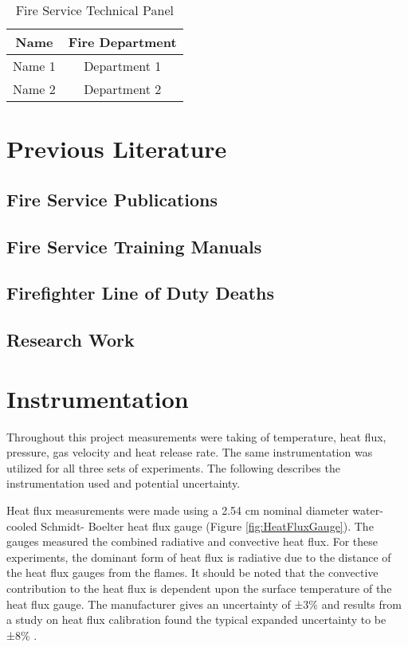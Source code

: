 \documentclass{article}
\begin{document}
\renewcommand{\arraystretch}{1.5}

\begin{table}[H]
	\centering
	\caption{Fire Service Technical Panel}
	\begin{tabular}{|c|c|}
		\hline
		\bf{Name} & \bf{Fire Department} \\ \hline \hline
		Name 1 & Department 1 \\ \hline
		Name 2 & Department 2 \\ \hline
	\end{tabular}
	\label{tab:TechPanelList}
\end{table}

\clearpage

\section{Previous Literature}
\subsection{Fire Service Publications}
\subsection{Fire Service Training Manuals}
\subsection{Firefighter Line of Duty Deaths}
\subsection{Research Work}

\clearpage

\section{Instrumentation}
Throughout this project measurements were taking of temperature, heat flux, pressure, gas velocity and heat release rate. The same instrumentation was utilized for all three sets of experiments. The following describes the instrumentation used and potential uncertainty.

Heat flux measurements were made using a 2.54 cm nominal diameter water-cooled Schmidt- Boelter heat flux gauge (Figure \ref{fig:HeatFluxGauge}). The gauges measured the combined radiative and convective heat flux. For these experiments, the dominant form of heat flux is radiative due to the distance of the heat flux gauges from the flames. It should be noted that the convective contribution to the heat flux is dependent upon the surface temperature of the heat flux gauge. The manufacturer gives an uncertainty of ±3\% and results from a study on heat flux calibration found the typical expanded uncertainty to be ±8\% \cite{HeatFluxRoundRobin}.
\end{document}
